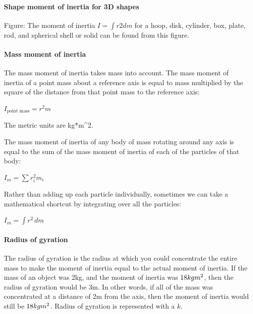 \paragraph{Shape moment of inertia for 3D shapes}






Figure: The moment of inertia $I=\int r2dm$ for a hoop, disk, cylinder, box, plate, rod, and spherical shell or solid can be found from this figure.



\paragraph{Mass moment of inertia}



The mass moment of inertia takes mass into account. The mass moment of inertia of a point mass about a reference axis is equal to mass multiplied by the square of the distance from that point mass to the reference axis:



$I _\text{point mass} = r^2 m \,$



The metric units are kg*m^2.



The mass moment of inertia of any body of mass rotating around any axis is equal to the sum of the mass moment of inertia of each of the particles of that body:



$I _m = \sum r _i^2 m _i$



Rather than adding up each particle individually, sometimes we can take a mathematical shortcut by integrating over all the particles:



$I _m = \int r^2 \,dm$



\paragraph{Radius of gyration}



The radius of gyration is the radius at which you could concentrate the entire mass to make the moment of inertia equal to the actual moment of inertia. If the mass of an object was 2kg, and the moment of inertia was $18kg\*m^2$, then the radius of gyration would be 3m. In other words, if all of the mass was concentrated at a distance of 2m from the axis, then the moment of inertia would still be $18kg\*m^2$. Radius of gyration is represented with a $k$.






